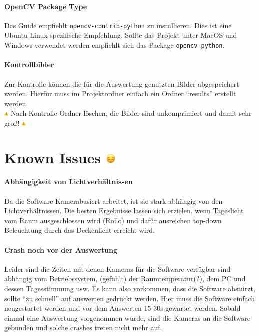 \documentclass[a4paper, 10pt]{article}
\newcommand{\code}[1]{\texttt{#1}}
\begin{document}
\paragraph{OpenCV Package Type}
Das Guide empfiehlt \code{opencv-contrib-python} zu installieren. Dies ist eine Ubuntu Linux spezifische Empfehlung. Sollte das Projekt unter MacOS und Windows verwendet werden empfiehlt sich das Package \code{opencv-python}.

\paragraph{Kontrollbilder}
Zur Kontrolle können die für die Auswertung genutzten Bilder abgespeichert werden. Hierfür muss im Projektordner einfach ein Ordner \enquote{results} erstellt werden.
\\
{\footnotesize \includegraphics[height=0.6em]{emojis/warning.png} Nach Kontrolle Ordner löschen, die Bilder sind unkomprimiert und damit sehr groß! \includegraphics[height=0.6em]{emojis/warning.png}}

\section{Known Issues \includegraphics[height=0.65em]{emojis/pensive.png}}
\label{sec:known-issues}
\paragraph{Abhängigkeit von Lichtverhältnissen} Da die Software Kamerabasiert arbeitet, ist sie stark abhängig von den Lichtverhältnissen. Die besten Ergebnisse lassen sich erzielen, wenn Tageslicht vom Raum ausgeschlossen wird (Rollo) und dafür ausreichen top-down Beleuchtung durch das Deckenlicht erreicht wird.

\paragraph{Crash noch vor der Auswertung} Leider sind die Zeiten mit denen  Kameras für die Software verfügbar sind abhängig vom Betriebssystem, (gefühlt) der Raumtemperatur(?), dem PC und dessen Tagesstimmung usw. Es kann also vorkommen, dass die Software abstürzt, sollte \enquote{zu schnell} auf auswerten gedrückt werden. Hier muss die Software einfach neugestartet werden und vor dem Auswerten 15-30s gewartet werden. Sobald einmal eine Auswertung vorgenommen wurde, sind die Kameras an die Software gebunden und solche crashes treten nicht mehr auf.
\end{document}
